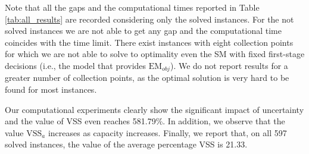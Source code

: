 \documentclass[preprint,11pt,authoryear]{elsarticle}
\begin{document}
Note that all the gaps and the computational times reported in Table \ref{tab:all_results} are recorded considering only the solved instances. For the not solved instances we are not able to get any gap and the computational time coincides with the time limit.
There exist instances with eight collection points for which we are not able to solve to optimality even the SM with fixed first-stage decisions (i.e., the model that provides $\text{EM}_{obj}$).
%
We do not report results for a greater number of collection points, as the optimal solution is very hard to be found for most instances. 

Our computational experiments clearly show the significant impact of uncertainty and the value of VSS even reaches 581.79\%. In addition, we observe that the value $\text{VSS}_a$ increases as capacity increases. Finally, we report that, on all 597 solved instances, the value of the average percentage VSS is 21.33.
\end{document}

